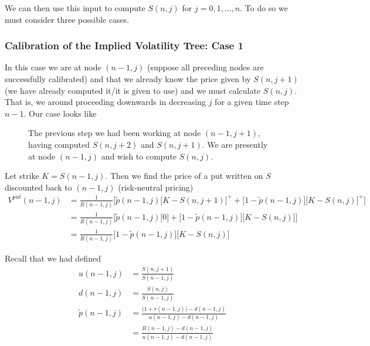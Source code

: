 \documentclass[12pt]{article}
\newlength\tindent
\renewcommand{\indent}{\hspace*{\tindent}}
\begin{document}
We can then use this input to compute $S(n,j)$ for $j = 0,1,...,n$. To do so we must consider three possible cases.

\subsubsection{Calibration of the Implied Volatility Tree: Case 1}

\indent In this case we are at node $(n - 1, j)$ (suppose all preceding nodes are successfully calibrated) and that we already know the price given by $S(n, j + 1)$ (we have already computed it/it is given to use) and we must calculate $S(n,j)$. That is, we around proceeding downwards in decreasing $j$ for a given time step $n - 1$. Our case looks like

\begin{figure}[H]
\centering
{}
\caption{The previous step we had been working at node $(n - 1, j + 1)$, having computed $S(n, j + 2)$ and $S(n, j + 1)$. We are presently at node $(n - 1, j)$ and wish to compute $S(n, j)$.}
\end{figure}

Let strike $K = S(n - 1, j)$. Then we find the price of a put written on $S$ discounted back to $(n - 1, j)$ (risk-neutral pricing) 
\begin{align*}
	V^{put}(n - 1,j) &= \frac{1}{R(n - 1, j)} \Big[ \tilde{p}(n - 1, j) \big[K - S(n,j + 1) \big]^+ + \big[1 - \tilde{p}(n - 1, j)\big] \big[K - S(n,j) \big]^+ \Big] \\
	&= \frac{1}{R(n - 1, j)} \Big[ \tilde{p}(n - 1, j) \big[ 0 \big] + \big[1 - \tilde{p}(n - 1, j)\big] \big[K - S(n,j) \big] \Big] \\
	&= \frac{1}{R(n - 1, j)} \big[1 - \tilde{p}(n - 1, j)\big] \big[K - S(n,j) \big] 
\end{align*}

Recall that we had defined
\begin{align*}
	u(n - 1, j) &= \frac{ S(n, j + 1) }{ S(n - 1, j) } \\
	d(n - 1, j) &= \frac{ S(n, j) }{ S(n - 1, j) } \\
	\tilde{p}(n - 1,j) &= \frac{ \big( 1 + r(n - 1,j)\big) - d(n - 1, j) }{ u(n - 1, j) - d(n - 1, j) } \\
	&= \frac{ R(n - 1, j) - d(n - 1, j) }{ u(n - 1, j) - d(n - 1, j) }
\end{align*}
\end{document}

